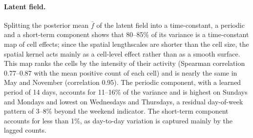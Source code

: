\paragraph{Latent field.}
Splitting the posterior mean $\bar f$ of the latent field into a time-constant, a periodic and a short-term component shows that 80--85\% of its variance is a time-constant map of cell effects; since the spatial lengthscales are shorter than the cell size, the spatial kernel acts mainly as a cell-level effect rather than as a smooth surface. This map ranks the cells by the intensity of their activity (Spearman correlation 0.77--0.87 with the mean positive count of each cell) and is nearly the same in May and November (correlation 0.95). The periodic component, with a learned period of 14 days, accounts for 11--16\% of the variance and is highest on Sundays and Mondays and lowest on Wednesdays and Thursdays, a residual day-of-week pattern of 3--8\% beyond the weekend indicator. The short-term component accounts for less than 1\%, as day-to-day variation is captured mainly by the lagged counts.
